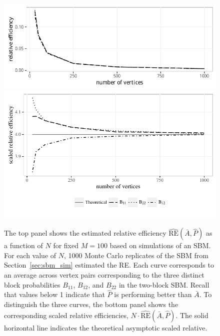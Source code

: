 \documentclass[journal,twoside,web]{ieeecolor}
\begin{document}
\begin{figure}[!htbp]
    \centering
    \includegraphics[width=1\linewidth]{RE.pdf}
    \includegraphics[width=1\linewidth]{scaled_RE.pdf}
    \caption{
    The top panel shows the estimated relative efficiency $\hat{\mathrm{RE}}(\bar{A},\hat{P})$ as a function of $N$ for fixed $M=100$ based on simulations of an SBM.
    For each value of $N$, 1000 Monte Carlo replicates of the SBM from Section~\ref{sec:sbm_sim} estimated the RE.
    Each curve corresponds to an average across vertex pairs corresponding to the three distinct block probabilities $B_{11}$, $B_{12}$, and $B_{22}$ in the two-block SBM.
    Recall that values below 1 indicate that $\hat{P}$ is performing better than $\bar{A}$.
    To distinguish the three curves, the bottom panel shows the corresponding scaled relative efficiencies, $N\cdot \hat{\mathrm{RE}}(\bar{A},\hat{P})$.
    The solid horizontal line indicates the theoretical asymptotic scaled relative. }%
    \label{fig:RE}
\end{figure}
\end{document}
